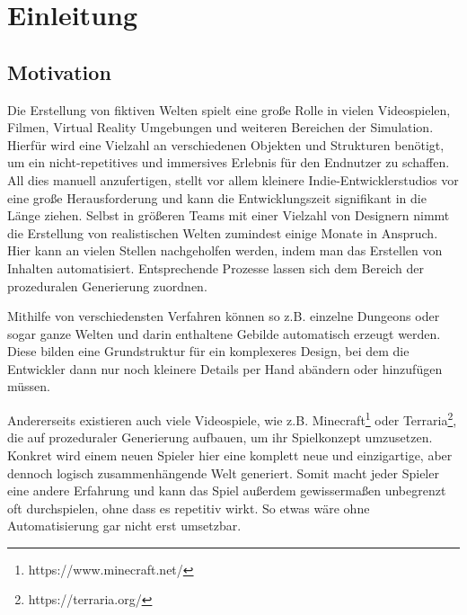 %
\chapter{Einleitung}

\section{Motivation}
Die Erstellung von fiktiven Welten spielt eine große Rolle in vielen Videospielen, Filmen, Virtual Reality Umgebungen
und weiteren Bereichen der Simulation. Hierfür wird eine Vielzahl an verschiedenen Objekten und Strukturen benötigt, um
ein nicht-repetitives und immersives Erlebnis für den Endnutzer zu schaffen. All dies manuell anzufertigen, stellt vor
allem kleinere Indie-Entwicklerstudios vor eine große Herausforderung und kann die Entwicklungszeit signifikant in die
Länge ziehen. Selbst in größeren Teams mit einer Vielzahl von Designern nimmt die Erstellung von realistischen Welten zumindest
einige Monate in Anspruch. \cite{10_freiknecht} Hier kann an vielen Stellen nachgeholfen werden, indem man das Erstellen
von Inhalten automatisiert. Entsprechende Prozesse lassen sich dem Bereich der prozeduralen Generierung zuordnen.

Mithilfe von verschiedensten Verfahren können so z.B. einzelne Dungeons oder sogar ganze Welten und darin enthaltene Gebilde
automatisch erzeugt werden. Diese bilden eine Grundstruktur für ein komplexeres Design, bei dem die Entwickler dann nur noch
kleinere Details per Hand abändern oder hinzufügen müssen. \cite{10_freiknecht}

Andererseits existieren auch viele Videospiele, wie z.B. Minecraft\footnote{https://www.minecraft.net/} oder
Terraria\footnote{https://terraria.org/}, die auf prozeduraler Generierung aufbauen, um ihr Spielkonzept umzusetzen.
Konkret wird einem neuen Spieler hier eine komplett neue und einzigartige, aber dennoch logisch
zusammenhängende Welt generiert. Somit macht jeder Spieler eine andere Erfahrung und kann das Spiel außerdem gewissermaßen
unbegrenzt oft durchspielen, ohne dass es repetitiv wirkt. So etwas wäre ohne Automatisierung gar nicht erst umsetzbar.

